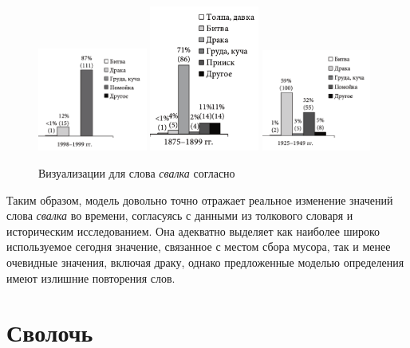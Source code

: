 \noindent %
\begin{figure}[H]
    \centering %
    \includegraphics[width=0.32\textwidth]{img/book/Свалка 1998-1999}
    \hfill %
    \includegraphics[width=0.32\textwidth]{img/book/Свалка 1875-1799}
    \hfill %
    \includegraphics[width=0.32\textwidth]{img/book/Свалка 1925-1949}
    \caption{Визуализации для слова \textit{свалка} согласно~\cite{TwoCenturies}}
\end{figure}

Таким образом, модель довольно точно отражает реальное изменение значений слова \textit{свалка}
во времени, согласуясь с данными из толкового словаря и историческим исследованием.
Она адекватно выделяет как наиболее широко используемое сегодня значение,
связанное с местом сбора мусора,
так и менее очевидные значения, включая драку,
однако предложенные моделью определения имеют излишние повторения слов.

\section*{Сволочь}

